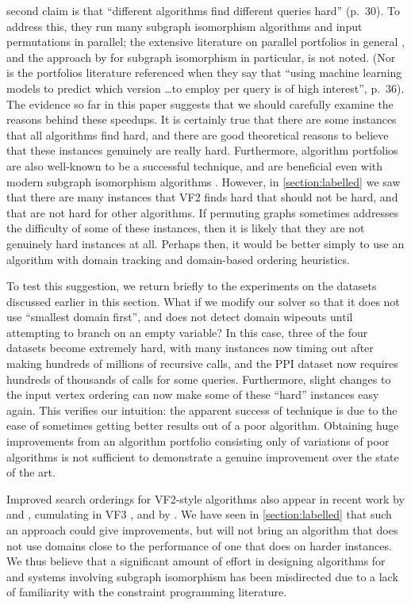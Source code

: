 \documentclass[twoside,11pt]{article}
\begin{document}
 second claim is that ``different
algorithms find different queries hard'' (p.\ 30). To address this, they run many subgraph isomorphism
algorithms and input permutations in parallel; the extensive literature on parallel portfolios in
general \cite{DBLP:journals/ai/GomesS01}, and the approach by  for
subgraph isomorphism in particular, is not noted. (Nor is the portfolios literature referenced when
they say that ``using machine learning models to predict which version \ldots to employ per query is
of high interest'', p.\ 36).  The evidence so far in this paper suggests that we should carefully examine
the reasons behind these speedups. It is certainly true that there are some instances that all
algorithms find hard, and there are good theoretical reasons to believe that these instances
genuinely are really hard.  Furthermore, algorithm portfolios are also well-known to be a successful
technique, and are beneficial even with modern subgraph isomorphism algorithms
\cite{DBLP:conf/lion/KotthoffMS16}.  However, in \cref{section:labelled} we saw that there are many
instances that VF2 finds hard that should not be hard, and that are not hard for other algorithms.
If permuting graphs sometimes addresses the difficulty of some of these instances, then it is likely
that they are not genuinely hard instances at all. Perhaps then, it would be better simply to use an
algorithm with domain tracking and domain-based ordering heuristics.

To test this suggestion, we return briefly to the experiments on the datasets discussed earlier in
this section. What if we modify our solver so that it does not use ``smallest domain first'', and
does not detect domain wipeouts until attempting to branch on an empty variable?  In this case, three of
the four datasets become extremely hard, with many instances now timing out after making hundreds of
millions of recursive calls, and the PPI dataset now requires hundreds of thousands of calls for
some queries.  Furthermore, slight changes to the input vertex ordering can now make some of these
``hard'' instances easy again.  This verifies our intuition: the apparent success of
 technique is due to the ease of sometimes getting better
results out of a poor algorithm. Obtaining huge improvements from an algorithm portfolio consisting
only of variations of poor algorithms is not sufficient to demonstrate a genuine improvement over
the state of the art.

Improved search orderings for VF2-style algorithms also appear in recent work by
 and , cumulating in VF3
\cite{DBLP:conf/gbrpr/CarlettiFSV17,o:CarlettiFSV17}, and by . We
have seen in \cref{section:labelled} that such an approach could give improvements, but will not
bring an algorithm that does not use domains close to the performance of one that does on harder
instances.  We thus believe that a significant amount of effort in designing algorithms for and
systems involving subgraph isomorphism has been misdirected due to a lack of familiarity with the
constraint programming literature.
\end{document}
